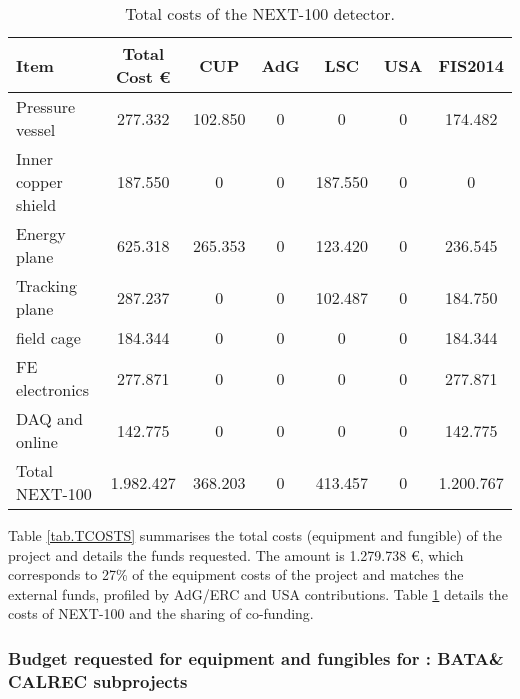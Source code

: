 %
\begin{table}[h!]
\begin{center}
\begin{tabular}{|l|c|c|c|c|c|c|}
\hline
 Item & Total Cost \euro & CUP	&AdG &	LSC & USA &	FIS2014 \\
 \hline
 Pressure vessel &	 277.332 & 	 102.850 & 	 0 & 	 0 & 	 0 & 	 174.482 \\ 
Inner copper shield &	 187.550 & 	 0 & 	 0 & 	 187.550 & 	 0 & 	 0 \\ 
Energy plane	& 625.318 & 	 265.353 & 	 0 & 	 123.420 & 	 0 & 	 236.545 \\ 
Tracking plane	&  287.237 & 	 0 & 	 0 & 	 102.487 & 	 0 & 	 184.750 \\ 
field cage	 & 184.344 & 	 0 & 	 0 & 	 0 & 	 0 & 	 184.344 \\ 
FE electronics	& 277.871 & 	 0 & 	 0 & 	 0 & 	 0 & 	 277.871 \\
DAQ and online &	 142.775 & 	 0 & 	 0 & 	 0 & 	 0 & 	 142.775 \\ 
Total NEXT-100	 & 1.982.427 & 	 368.203 & 	 0 & 	 413.457 & 	 0 & 	 1.200.767 \\ 
  \hline\hline
\end{tabular}  
\caption{Total costs of the NEXT-100 detector.}
\label{tab.TN100}
\end{center}
\end{table} 
 
Table \ref{tab.TCOSTS} summarises the total costs (equipment and fungible) of the project and details the funds requested. The amount is 1.279.738 \euro, which corresponds to 27\% of the equipment costs of the project and matches the external funds, profiled by AdG/ERC and USA contributions. 
Table \ref{tab.TN100} details the costs of NEXT-100 and the sharing of co-funding. 

\subsubsection*{Budget requested for equipment and fungibles for \BATA: BATA\& CALREC subprojects}

